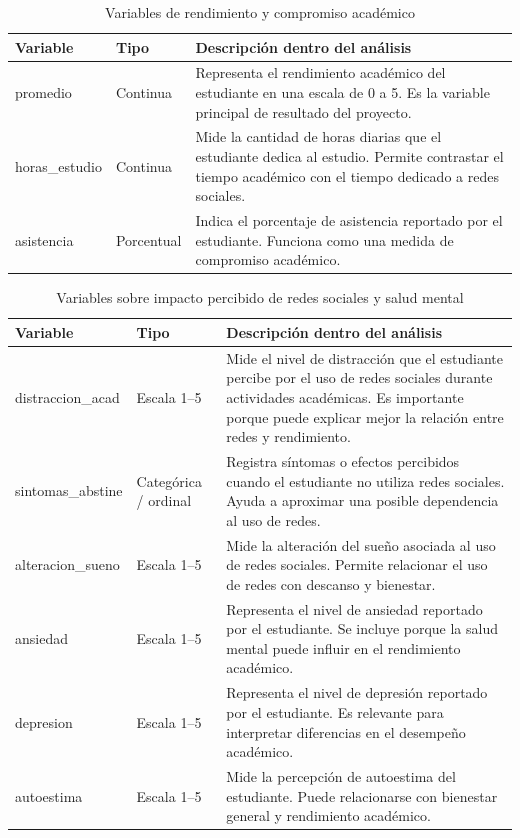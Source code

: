 \documentclass[12pt]{article}
\begin{document}
\begin{table}[H]
\centering
\caption{Variables de rendimiento y compromiso académico}
\label{tab:variables_academicas}
\begin{tabular}{p{4cm} p{3cm} p{7cm}}
\toprule
\textbf{Variable} & \textbf{Tipo} & \textbf{Descripción dentro del análisis} \\
\midrule
promedio & Continua & Representa el rendimiento académico del estudiante en una escala de 0 a 5. Es la variable principal de resultado del proyecto. \\

horas\_estudio & Continua & Mide la cantidad de horas diarias que el estudiante dedica al estudio. Permite contrastar el tiempo académico con el tiempo dedicado a redes sociales. \\

asistencia & Porcentual & Indica el porcentaje de asistencia reportado por el estudiante. Funciona como una medida de compromiso académico. \\
\bottomrule
\end{tabular}
\end{table}

\begin{table}[H]
\centering
\caption{Variables sobre impacto percibido de redes sociales y salud mental}
\label{tab:variables_impacto_salud}
\begin{tabular}{p{4cm} p{3cm} p{7cm}}
\toprule
\textbf{Variable} & \textbf{Tipo} & \textbf{Descripción dentro del análisis} \\
\midrule
distraccion\_acad & Escala 1--5 & Mide el nivel de distracción que el estudiante percibe por el uso de redes sociales durante actividades académicas. Es importante porque puede explicar mejor la relación entre redes y rendimiento. \\

sintomas\_abstine & Categórica / ordinal & Registra síntomas o efectos percibidos cuando el estudiante no utiliza redes sociales. Ayuda a aproximar una posible dependencia al uso de redes. \\

alteracion\_sueno & Escala 1--5 & Mide la alteración del sueño asociada al uso de redes sociales. Permite relacionar el uso de redes con descanso y bienestar. \\

ansiedad & Escala 1--5 & Representa el nivel de ansiedad reportado por el estudiante. Se incluye porque la salud mental puede influir en el rendimiento académico. \\

depresion & Escala 1--5 & Representa el nivel de depresión reportado por el estudiante. Es relevante para interpretar diferencias en el desempeño académico. \\

autoestima & Escala 1--5 & Mide la percepción de autoestima del estudiante. Puede relacionarse con bienestar general y rendimiento académico. \\
\bottomrule
\end{tabular}
\end{table}
\end{document}
